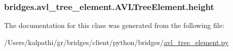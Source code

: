 \subsubsection[{height}]{\setlength{\rightskip}{0pt plus 5cm}bridges.\+avl\+\_\+tree\+\_\+element.\+A\+V\+L\+Tree\+Element.\+height}\label{classbridges_1_1avl__tree__element_1_1_a_v_l_tree_element_a83590431488989ab3143e69c5fc2deb3}


The documentation for this class was generated from the following file\+:\begin{DoxyCompactItemize}
\item 
/\+Users/kalpathi/gr/bridges/client/python/bridges/\hyperlink{avl__tree__element_8py}{avl\+\_\+tree\+\_\+element.\+py}\end{DoxyCompactItemize}

